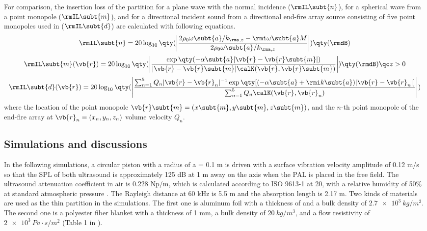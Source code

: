 For comparison, the insertion loss of the partition for a
plane wave with the normal incidence ($\rmIL\subt{n}$), for a spherical
wave from a point monopole ($\rmIL\subt{m}$), and for a directional incident
sound from a directional end-fire array source consisting
of five point monopoles used in \cite{Tu2016RobustnessCompactEndfire} ($\rmIL\subt{d}$) are
calculated with following equations.
\begin{equation}
    \rmIL\subt{n} = 20\log_{10}
    \qty(\left| \frac{2\rho_0\omega\subt{a}/k_{\rma,z} - \rmi \omega\subt{a} M}{2\rho_0\omega\subt{a}/k_{\rma, z}}\right|) \qty(\rmdB)
\end{equation}
\begin{equation}
    \rmIL\subt{m}(\vb{r}) = 
    20\log_{10}\qty(\left| \frac{\exp\qty(-\alpha\subt{a} | \vb{r}-\vb{r}\subt{m}| )}{|\vb{r}-\vb{r}\subt{m}| \calK(\vb{r},\vb{r}\subt{m})} \right|)
    \qty(\rmdB)\qc
    z>0
\end{equation}
\begin{equation}
    \rmIL\subt{d}(\vb{r})
    = 20\log_{10}
    \qty(\left| \frac{\sum_{n=1}^5 Q_n |\vb{r} - \vb{r}_n|^{-1} \exp\qty[(-\alpha\subt{a} + \rmi k\subt{a})|\vb{r}-\vb{r}_n|]}{\sum_{n=1}^5 Q_n \calK(\vb{r},\vb{r}_n)}\right|)
\end{equation}
where the location of the point monopole $\vb{r}\subt{m} = (x\subt{m}, y\subt{m}, z\subt{m})$,  and the $n$\mbox{-th} point monopole of the end-fire array at $\vb{r}_n = (x_n,y_n,z_n)$  volume velocity $Q_n$.

\subsection{Simulations and discussions}
\label{sec:transmission_sim}
In the following simulations, a circular piston with a radius of a = 0.1 m is driven with a surface vibration velocity amplitude of 0.12 m/s so that the SPL of both ultrasound is approximately 125 dB at 1 m away on the axis when the PAL is placed in the free field.
The ultrasound attenuation coefficient in air is 0.228 Np/m, which is calculated according to ISO 9613-1 at 20\celsius, with a relative humidity of 50\% at standard atmospheric pressure \cite{1993ISO961311993}. 
The Rayleigh distance at 60 kHz is 5.5 m and the absorption length is 2.17 m. 
Two kinds of materials are used as the thin partition in the simulations. The first one is aluminum foil with a thickness of  and a bulk density of $\SI{2.7 e3 }{kg/m^3}$. 
The second one is a polyester fiber blanket with a thickness of 1 mm, a bulk density of $\SI{20}{kg/m^3}$, and a flow resistivity of $\SI{2e3}{Pa\cdot s/m^2}$ (Table 1 in \cite{Garai2005SimpleEmpiricalModel}). 

